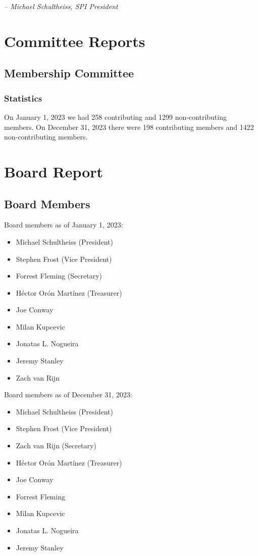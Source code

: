 \documentclass[a4paper]{report}
\begin{document}
  \emph{-- Michael Schultheiss, SPI President}

\newpage

\tableofcontents

\newpage

\chapter{Committee Reports}
\section{Membership Committee}

\subsection{Statistics}

On January 1, 2023 we had 258 contributing and 1299 non-contributing members.  On December 31, 2023 there were 198 contributing members and 1422 non-contributing members.

\chapter{Board Report}
\section{Board Members}

Board members as of January 1, 2023:

\begin{itemize}
\item Michael Schultheiss (President)
\item Stephen Frost (Vice President)
\item Forrest Fleming (Secretary)
\item Héctor Orón Martínez (Treasurer)
\item Joe Conway
\item Milan Kupcevic
\item Jonatas L. Nogueira
\item Jeremy Stanley
\item Zach van Rijn
\end{itemize}

Board members as of December 31, 2023:

\begin{itemize}
\item Michael Schultheiss (President)
\item Stephen Frost (Vice President)
\item Zach van Rijn (Secretary)
\item Héctor Orón Martínez (Treasurer)
\item Joe Conway
\item Forrest Fleming
\item Milan Kupcevic
\item Jonatas L. Nogueira
\item Jeremy Stanley
\end{itemize}
\end{document}
